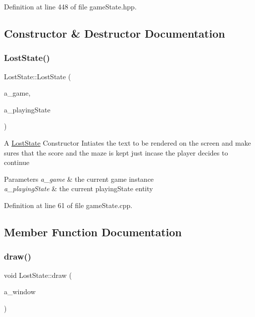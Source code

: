 Definition at line 448 of file game\+State.\+hpp.



\subsection{Constructor \& Destructor Documentation}
\mbox{\label{class_lost_state_a92bfadd289d793b53b4395510d35f052}} 
\subsubsection{\texorpdfstring{Lost\+State()}{LostState()}}
{\footnotesize\ttfamily Lost\+State\+::\+Lost\+State (\begin{DoxyParamCaption}\item[{\hyperlink{class_game}{Game} $\ast$}]{a\+\_\+game,  }\item[{\hyperlink{class_game_state}{Game\+State} $\ast$}]{a\+\_\+playing\+State }\end{DoxyParamCaption})}

A \hyperlink{class_lost_state}{Lost\+State} Constructor Intiates the text to be rendered on the screen and make sures that the score and the maze is kept just incase the player decides to continue 
\begin{DoxyParams}{Parameters}
{\em a\+\_\+game} & the current game instance \\
\hline
{\em a\+\_\+playing\+State} & the current playing\+State entity \\
\hline
\end{DoxyParams}


Definition at line 61 of file game\+State.\+cpp.



\subsection{Member Function Documentation}
\mbox{\label{class_lost_state_acfdefa77d7ed756a1052d39ed2de8786}} 
\subsubsection{\texorpdfstring{draw()}{draw()}}
{\footnotesize\ttfamily void Lost\+State\+::draw (\begin{DoxyParamCaption}\item[{sf\+::\+Render\+Window \&}]{a\+\_\+window }\end{DoxyParamCaption})\hspace{0.3cm}{\ttfamily [virtual]}}


